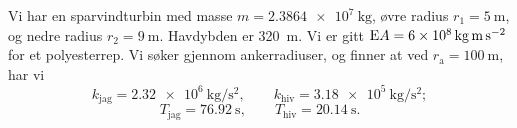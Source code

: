 Vi har en sparvindturbin med masse $m = \SI{2.3864e7}{\kilo\gram}$, øvre radius $r_1 = \SI{5}{\meter}$, og nedre radius $r_2 = \SI{9}{\meter}$.
Havdybden er \SI{320}{\meter}.
Vi er gitt $\mathrm{E} A = \SI{6e8}{\kilo\gram\meter\per\second\squared}$ for et polyesterrep.
Vi søker gjennom ankerradiuser, og finner at ved $r_{\mathrm{a}} = \SI{100}{\meter}$, har vi
\[
        k_{\mathrm{jag}} = \SI{2.32e6}{\kilo\gram\per\second\squared}, \qquad k_{\mathrm{hiv}} = \SI{3.18e5}{\kilo\gram\per\second\squared};
\]
\[
        T_{\mathrm{jag}} = \SI{76.92}{\second}, \qquad T_{\mathrm{hiv}} = \SI{20.14}{\second}.
\]
